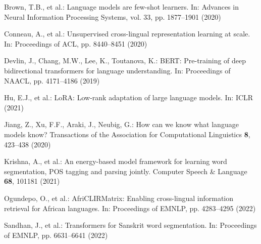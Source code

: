 \documentclass[runningheads]{llncs}
\begin{document}
\begin{thebibliography}{8}
Brown, T.B., et al.: Language models are few-shot learners. In: Advances in Neural Information Processing Systems, vol. 33, pp. 1877--1901 (2020)

Conneau, A., et al.: Unsupervised cross-lingual representation learning at scale. In: Proceedings of ACL, pp. 8440--8451 (2020)

Devlin, J., Chang, M.W., Lee, K., Toutanova, K.: BERT: Pre-training of deep bidirectional transformers for language understanding. In: Proceedings of NAACL, pp. 4171--4186 (2019)

Hu, E.J., et al.: LoRA: Low-rank adaptation of large language models. In: ICLR (2021)

Jiang, Z., Xu, F.F., Araki, J., Neubig, G.: How can we know what language models know? Transactions of the Association for Computational Linguistics \textbf{8}, 423--438 (2020)

Krishna, A., et al.: An energy-based model framework for learning word segmentation, POS tagging and parsing jointly. Computer Speech \& Language \textbf{68}, 101181 (2021)

Ogundepo, O., et al.: AfriCLIRMatrix: Enabling cross-lingual information retrieval for African languages. In: Proceedings of EMNLP, pp. 4283--4295 (2022)

Sandhan, J., et al.: Transformers for Sanskrit word segmentation. In: Proceedings of EMNLP, pp. 6631--6641 (2022)

\end{thebibliography}
\end{document}
